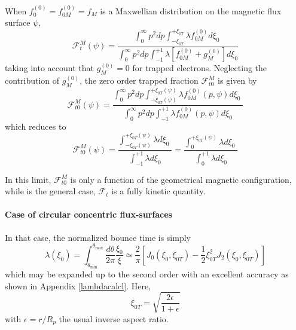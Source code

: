 When $f_{0}^{\left( 0\right) }=f_{0M}^{\left( 0\right) }=f_{M}$ is a
Maxwellian distribution on the magnetic flux surface $\psi,$
\begin{equation}
\mathcal{F}_{t}^{M}\left( \psi\right) =\frac{\int_{0}^{\infty}p^{2}dp\int_{-%
\xi_{0T}}^{+\xi_{0T}}\lambda f_{0M}^{\left( 0\right) }d\xi_{0}\;}{
\int_{0}^{\infty}p^{2}dp\int_{-1}^{+1}\lambda\left[ f_{0M}^{\left( 0\right)
}+g_{M}^{\left( 0\right) }\right] d\xi_{0}}
\end{equation}
taking into account that $g_{M}^{\left( 0\right) }=0$ for trapped electrons.
Neglecting the contribution of $g_{M}^{\left( 0\right) }$, the zero order
trapped fraction $\mathcal{F}_{t0}^{M}$ is given by
\begin{equation}
\mathcal{F}_{t0}^{M}\left( \psi\right) =\frac{\int_{0}^{\infty}p^{2}dp%
\int_{-\xi_{0T}\left( \psi\right) }^{+\xi_{0T}\left( \psi\right) }\lambda
f_{0M}^{\left( 0\right) }\left( p,\psi\right) d\xi_{0}\;}{
\int_{0}^{\infty}p^{2}dp\int_{-1}^{+1}\lambda f_{0M}^{\left( 0\right)
}\left( p,\psi\right) d\xi_{0}}
\end{equation}
which reduces to
\begin{equation}
\mathcal{F}_{t0}^{M}\left( \psi\right) =\frac{\int_{-\xi_{0T}\left(
\psi\right) }^{+\xi_{0T}\left( \psi\right) }\lambda d\xi_{0}\;}{\int
_{-1}^{+1}\lambda d\xi_{0}}=\frac{\int_{0}^{+\xi_{0T}\left( \psi\right)
}\lambda d\xi_{0}\;}{\int_{0}^{+1}\lambda d\xi_{0}}
\end{equation}

In this limit, $\mathcal{F}_{t0}^{M}$ is only a function of the geometrical
magnetic configuration, while is the general case, $\mathcal{F}_{t}$ is a
fully kinetic quantity.

\paragraph{Case of circular concentric flux-surfaces}

In that case, the normalized bounce time is simply
\begin{equation}
\lambda\left( \xi_{0}\right) =\int_{\theta_{\min}}^{\theta_{\max}}\frac{
d\theta}{2\pi}\frac{\xi_{0}}{\xi}\simeq\frac{2}{\pi}\left[ J_{0}\left(
\xi_{0},\xi_{0T}\right) -\frac{1}{2}\xi_{0T}^{2}J_{2}\left( \xi_{0},\xi
_{0T}\right) \right]
\end{equation}
which may be expanded up to the second order with an excellent accuracy as
shown in Appendix \ref{lambdacalcl}. Here,
\begin{equation}
\xi_{0T}=\sqrt{\frac{2\epsilon}{1+\epsilon}}
\end{equation}
with $\epsilon=r/R_{p}$ the usual inverse aspect ratio.

